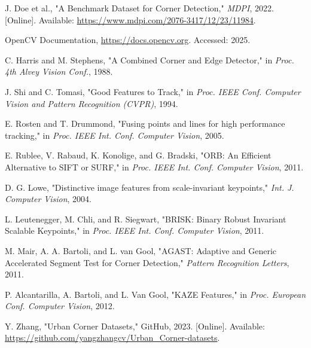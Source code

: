 \documentclass[journal]{IEEEtran}
\begin{document}
\begin{thebibliography}{1}

    J. Doe et al., "A Benchmark Dataset for Corner Detection," \textit{MDPI}, 2022. [Online]. Available: \url{https://www.mdpi.com/2076-3417/12/23/11984}.

    OpenCV Documentation, \url{https://docs.opencv.org}. Accessed: 2025.

    C. Harris and M. Stephens, "A Combined Corner and Edge Detector," in \textit{Proc. 4th Alvey Vision Conf.}, 1988.

    J. Shi and C. Tomasi, "Good Features to Track," in \textit{Proc. IEEE Conf. Computer Vision and Pattern Recognition (CVPR)}, 1994.

    E. Rosten and T. Drummond, "Fusing points and lines for high performance tracking," in \textit{Proc. IEEE Int. Conf. Computer Vision}, 2005.

    E. Rublee, V. Rabaud, K. Konolige, and G. Bradski, "ORB: An Efficient Alternative to SIFT or SURF," in \textit{Proc. IEEE Int. Conf. Computer Vision}, 2011.

    D. G. Lowe, "Distinctive image features from scale-invariant keypoints," \textit{Int. J. Computer Vision}, 2004.

    L. Leutenegger, M. Chli, and R. Siegwart, "BRISK: Binary Robust Invariant Scalable Keypoints," in \textit{Proc. IEEE Int. Conf. Computer Vision}, 2011.

    M. Mair, A. A. Bartoli, and L. van Gool, "AGAST: Adaptive and Generic Accelerated Segment Test for Corner Detection," \textit{Pattern Recognition Letters}, 2011.

    P. Alcantarilla, A. Bartoli, and L. Van Gool, "KAZE Features," in \textit{Proc. European Conf. Computer Vision}, 2012.

    Y. Zhang, "Urban Corner Datasets," GitHub, 2023. [Online]. Available: \url{https://github.com/yangzhangcv/Urban_Corner-datasets}.

\end{thebibliography}


\end{document}
